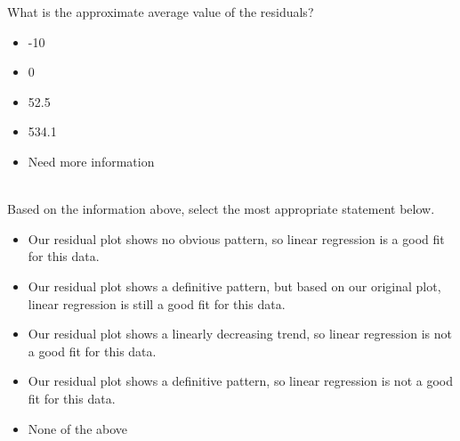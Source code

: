\begin{enumerate}
 What is the approximate average value of the residuals? 
\begin{itemize}[label=\bubble]
\item -10
\item 0
\item 52.5
\item 534.1
\item Need more information
\end{itemize} 
\\ 
\vfill
{} Based on the information above, select the most appropriate statement below. 
\begin{itemize}[label=\bubble]
\item Our residual plot shows no obvious pattern, so linear regression is a good fit for this data.
\item Our residual plot shows a definitive pattern, but based on our original plot, linear regression is still a good fit for this data.
\item Our residual plot shows a linearly decreasing trend, so linear regression is not a good fit for this data.
\item Our residual plot shows a definitive pattern, so linear regression is not a good fit for this data.
\item None of the above
\end{itemize} 
\\ 
\vfill



\end{enumerate}